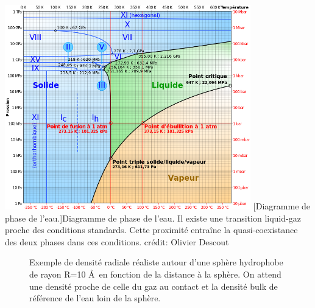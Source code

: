 \begin{center}
    \captionsetup{type=figure}
	\includegraphics[width=0.8\textwidth]{chapters/bridge/images/diagramme_phase_eau.png}
	[Diagramme de phase de l'eau.]{Diagramme de phase de l'eau. Il existe une transition liquid-gaz proche des conditions standards. Cette proximité entraîne la quasi-coexistance des deux phases dans ces conditions. crédit: Olivier Descout}
    \label{fig:diagramme_phase_eau}
\end{center}




\begin{figure}[h]
    \center    
    \caption[Représentation du démouillage autour d'une sphère hydrophobe.]{Exemple de densité radiale réaliste autour d'une sphère hydrophobe de rayon R=10 \AA\ en fonction de la distance à la sphère. On attend une densité proche de celle du gaz au contact et la densité bulk de référence de l'eau loin de la sphère.}
    \label{fig:demouillage}
\end{figure}



